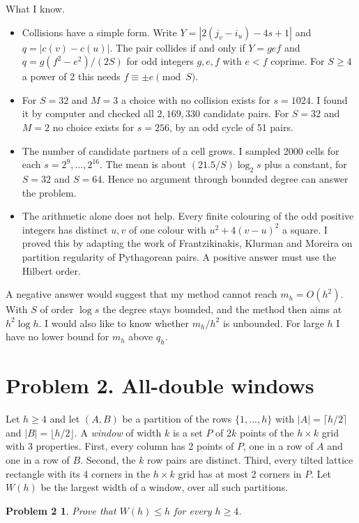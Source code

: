 \documentclass[10pt]{article}
\newtheorem*{problem2}{Problem 2}
\begin{document}
What I know.
\begin{itemize}
\item Collisions have a simple form. Write $Y=|2(j_v-i_u)-4s+1|$ and $q=|c(v)-c(u)|$. The pair
collides if and only if $Y=gef$ and $q=g(f^2-e^2)/(2S)$ for odd integers $g,e,f$ with $e<f$
coprime. For $S\ge4$ a power of 2 this needs $f\equiv\pm e\pmod S$.
\item For $S=32$ and $M=3$ a choice with no collision exists for $s=1024$. I found it by
computer and checked all $2{,}169{,}330$ candidate pairs. For $S=32$ and $M=2$ no choice exists
for $s=256$, by an odd cycle of 51 pairs.
\item The number of candidate partners of a cell grows. I sampled 2000 cells for each
$s=2^9,\dots,2^{16}$. The mean is about $(21.5/S)\log_2 s$ plus a constant, for $S=32$ and
$S=64$. Hence no argument through bounded degree can answer the problem.
\item The arithmetic alone does not help. Every finite colouring of the odd positive integers has
distinct $u,v$ of one colour with $u^2+4(v-u)^2$ a square. I proved this by adapting the work of
Frantzikinakis, Klurman and Moreira on partition regularity of Pythagorean pairs. A positive
answer must use the Hilbert order.
\end{itemize}

A negative answer would suggest that my method cannot reach $m_h=O(h^2)$. With $S$ of order
$\log s$ the degree stays bounded, and the method then aims at $h^2\log h$. I would also like
to know whether $m_h/h^2$ is unbounded. For large $h$ I have no lower bound for $m_h$ above $q_h$.

\section*{Problem 2. All-double windows}

Let $h\ge4$ and let $(A,B)$ be a partition of the rows $\{1,\dots,h\}$ with
$|A|=\lceil h/2\rceil$ and $|B|=\lfloor h/2\rfloor$. A \emph{window} of width $k$ is a set $P$ of
$2k$ points of the $h\times k$ grid with 3 properties. First, every column has 2 points of $P$,
one in a row of $A$ and one in a row of $B$. Second, the $k$ row pairs are distinct. Third, every
tilted lattice rectangle with its 4 corners in the $h\times k$ grid has at most 2 corners in $P$.
Let $W(h)$ be the largest width of a window, over all such partitions.

\begin{problem2}
Prove that $W(h)\le h$ for every $h\ge4$.
\end{problem2}
\end{document}
